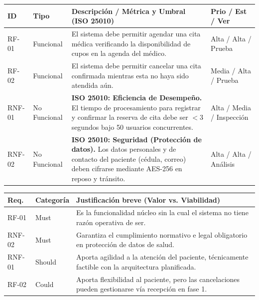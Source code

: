 \documentclass[11pt,a4paper]{article}
\newcommand{\subpregunta}[1]{%
  \vspace{5pt}\noindent{\bfseries\color{azulOscuro} #1}\par
}
\begin{document}
{\footnotesize
\setlength{\tabcolsep}{4pt}
\begin{tabularx}{\textwidth}{|>{\raggedright\arraybackslash}p{1.15cm}|>{\raggedright\arraybackslash}p{1.65cm}|>{\raggedright\arraybackslash}X|>{\raggedright\arraybackslash}p{2.8cm}|}
\hline
\textbf{ID} & \textbf{Tipo} & \textbf{Descripción / Métrica y Umbral (ISO 25010)} & \textbf{Prio / Est / Ver}\\ \hline
RF-01 & Funcional & El sistema debe permitir agendar una cita médica verificando la disponibilidad de cupos en la agenda del médico. & Alta / Alta / Prueba\\ \hline
RF-02 & Funcional & El sistema debe permitir cancelar una cita confirmada mientras esta no haya sido atendida aún. & Media / Alta / Prueba\\ \hline
RNF-01 & No Funcional & \textbf{ISO 25010: Eficiencia de Desempeño.} El tiempo de procesamiento para registrar y confirmar la reserva de cita debe ser $< 3$ segundos bajo 50 usuarios concurrentes. & Alta / Media / Inspección\\ \hline
RNF-02 & No Funcional & \textbf{ISO 25010: Seguridad (Protección de datos).} Los datos personales y de contacto del paciente (cédula, correo) deben cifrarse mediante AES-256 en reposo y tránsito. & Alta / Alta / Análisis\\ \hline
\end{tabularx}
}

\subpregunta{P6. Priorización MoSCoW (5 pts)}

{\footnotesize
\setlength{\tabcolsep}{4pt}
\begin{tabularx}{\textwidth}{|>{\raggedright\arraybackslash}p{1.35cm}|>{\raggedright\arraybackslash}p{1.9cm}|>{\raggedright\arraybackslash}X|}
\hline
\textbf{Req.} & \textbf{Categoría} & \textbf{Justificación breve (Valor vs. Viabilidad)}\\ \hline
RF-01 & Must & Es la funcionalidad núcleo sin la cual el sistema no tiene razón operativa de ser.\\ \hline
RNF-02 & Must & Garantiza el cumplimiento normativo e legal obligatorio en protección de datos de salud.\\ \hline
RNF-01 & Should & Aporta agilidad a la atención del paciente, técnicamente factible con la arquitectura planificada.\\ \hline
RF-02 & Could & Aporta flexibilidad al paciente, pero las cancelaciones pueden gestionarse vía recepción en fase 1.\\ \hline
\end{tabularx}
}
\end{document}
